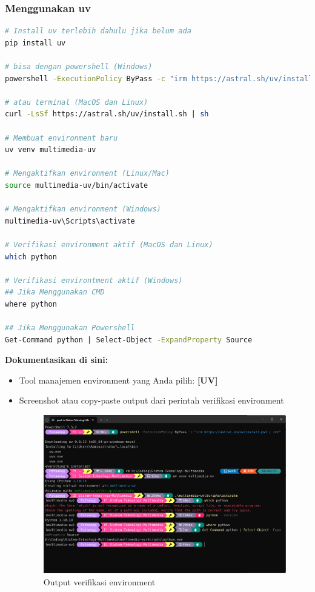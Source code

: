 \documentclass[11pt,a4paper]{article}
\begin{document}
\subsubsection{Menggunakan uv}
\begin{lstlisting}[language=bash, caption=Membuat environment dengan uv]
# Install uv terlebih dahulu jika belum ada
pip install uv

# bisa dengan powershell (Windows)
powershell -ExecutionPolicy ByPass -c "irm https://astral.sh/uv/install.ps1 | iex"

# atau terminal (MacOS dan Linux)
curl -LsSf https://astral.sh/uv/install.sh | sh

# Membuat environment baru
uv venv multimedia-uv

# Mengaktifkan environment (Linux/Mac)
source multimedia-uv/bin/activate

# Mengaktifkan environment (Windows)
multimedia-uv\Scripts\activate

# Verifikasi environment aktif (MacOS dan Linux)
which python

# Verifikasi environtment aktif (Windows)
## Jika Menggunakan CMD
where python

## Jika Menggunakan Powershell
Get-Command python | Select-Object -ExpandProperty Source

\end{lstlisting}

\textbf{Dokumentasikan di sini:}
\begin{itemize}
    \item Tool manajemen environment yang Anda pilih: \textbf{[UV]}
    \item Screenshot atau copy-paste output dari perintah verifikasi environment
    \begin{figure}[h!]
    \centering
    \includegraphics[scale = 0.5]{Figure/img1.png}
    \caption{Output verifikasi environment}
    \vspace{0.1cm}
    \end{figure}
\end{itemize}
\end{document}
